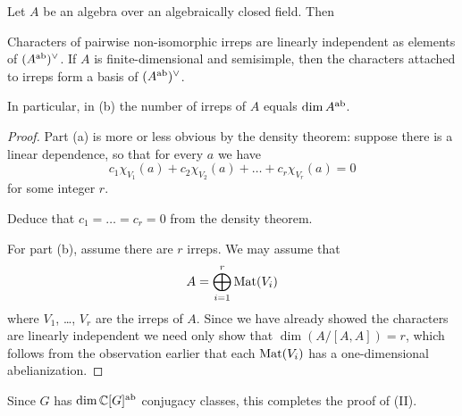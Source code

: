 \begin{theorem}
	Let $A$ be an algebra over an algebraically closed field. Then
	\begin{enumerate}[(a)]
		\ii Characters of pairwise non-isomorphic irreps are
		linearly independent as elements of $(A^\text{ab})^\vee$.
		\ii If $A$ is finite-dimensional and semisimple,
		then the characters attached to irreps
		form a basis of $(A^\text{ab})^\vee$.
	\end{enumerate}
	In particular, in (b) the number of irreps of $A$ equals $\dim A^\text{ab}$.
\end{theorem}
\begin{proof}
	Part (a) is more or less obvious by the density theorem:
	suppose there is a linear dependence, so that for every $a$ we have
	\[ c_1 \chi_{V_1}(a) + c_2 \chi_{V_2}(a) + \dots + c_r \chi_{V_r} (a) = 0\]
	for some integer $r$.
	\begin{ques}
		Deduce that $c_1 = \dots = c_r = 0$ from the density theorem.
	\end{ques}
	For part (b), assume there are $r$ irreps.
	We may assume that \[ A = \bigoplus_{i=1}^r \mathrm{Mat}(V_i) \]
	where $V_1$, \dots, $V_r$ are the irreps of $A$.
	Since we have already showed the characters are linearly independent
	we need only show that $\dim ( A / [A,A] ) = r$,
	which follows from the observation earlier that each $\mathrm{Mat}(V_i)$
	has a one-dimensional abelianization.
\end{proof}
Since $G$ has $\dim \mathbb C[G]^\text{ab}$ conjugacy classes,
this completes the proof of (II).

